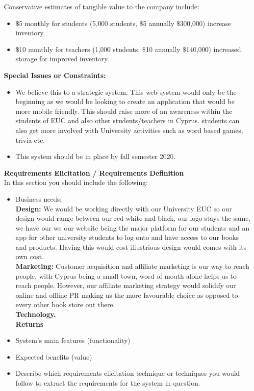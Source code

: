 \documentclass{article}
\begin{document}
\newpage
Conservative estimates of tangible value to the company include:
\begin{itemize}
\item \$5 monthly for students (5,000 students, \$5 annually \$300,000) increase inventory.
\item \$10 monthly for teachers (1,000 students, \$10 annually \$140,000) increased storage for improved inventory.
\end{itemize}
\textbf{Special Issues or Constraints:}
\begin{itemize}
\item We believe this to a strategic system. This web system would only be the beginning as we would be looking to create an application that would be more mobile friendly. This should raise more of an awareness within the students of EUC and also other students/teachers in Cyprus. students can also get more involved with University activities such as word based games, trivia etc.
\item This system should be in place by fall semester 2020.
\end{itemize}

\textbf{Requirements Elicitation / Requirements Definition}\\
In this section you should include the following:
\begin{itemize}
\item Business needs; \\ \textbf {Design:} We would be working directly with our University EUC so our design would range between our red white and black, our logo stays the same, we have our we our website being the major platform for our students and an app for other university students to log onto and have access to our books and products. Having this would cost illustrious design would comes with its own cost.\\ \textbf {Marketing:} Customer acquisition and affiliate marketing is our way to reach people, with Cyprus being a small town, word of mouth alone helps us to reach people. However, our affiliate marketing strategy would solidify our online and offline PR making us the more favourable choice as opposed to every other book store out there.  \\ \textbf {Technology.} \\ \textbf {Returns}
\item System’s main features (functionality)
\item Expected benefits (value)
\item Describe which requirements elicitation technique or techniques you would follow to
extract the requirements for the system in question.
\end{itemize}
\end{document}
